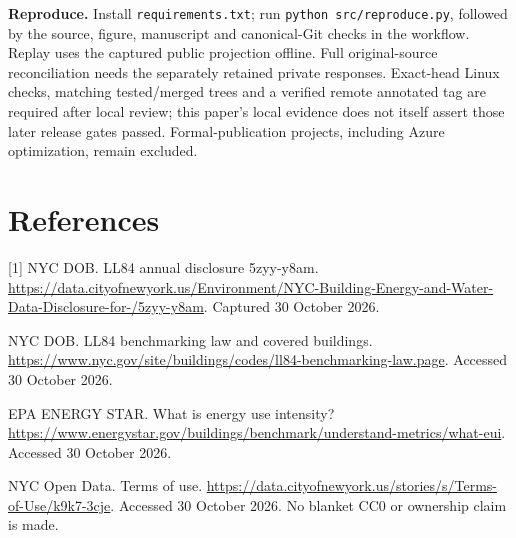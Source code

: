 \documentclass[10pt,letterpaper]{article}
\begin{document}
\textbf{Reproduce.} Install \texttt{requirements.txt}; run \texttt{python src/reproduce.py}, followed by the source, figure, manuscript and canonical-Git checks in the workflow. Replay uses the captured public projection offline. Full original-source reconciliation needs the separately retained private responses. Exact-head Linux checks, matching tested/merged trees and a verified remote annotated tag are required after local review; this paper's local evidence does not itself assert those later release gates passed. Formal-publication projects, including Azure optimization, remain excluded.

\section*{References}
{\small
[1] NYC DOB. LL84 annual disclosure 5zyy-y8am. \url{https://data.cityofnewyork.us/Environment/NYC-Building-Energy-and-Water-Data-Disclosure-for-/5zyy-y8am}. Captured 30 October 2026.\par
[2] NYC DOB. LL84 benchmarking law and covered buildings. \url{https://www.nyc.gov/site/buildings/codes/ll84-benchmarking-law.page}. Accessed 30 October 2026.\par
[3] EPA ENERGY STAR. What is energy use intensity? \url{https://www.energystar.gov/buildings/benchmark/understand-metrics/what-eui}. Accessed 30 October 2026.\par
[4] NYC Open Data. Terms of use. \url{https://data.cityofnewyork.us/stories/s/Terms-of-Use/k9k7-3cje}. Accessed 30 October 2026. No blanket CC0 or ownership claim is made.}
\end{document}
